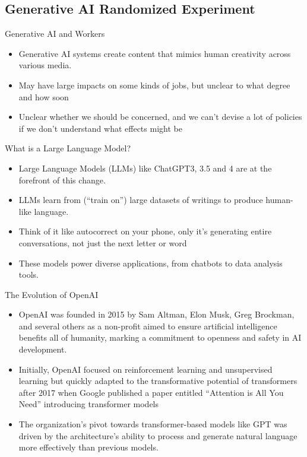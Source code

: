 \documentclass{beamer}
\begin{document}
\subsection{Generative AI Randomized Experiment}

\begin{frame}{Generative AI and Workers}
\begin{itemize}
  \item Generative AI systems create content that mimics human creativity across various media.
  \item May have large impacts on some kinds of jobs, but unclear to what degree and how soon
  \item Unclear whether we should be concerned, and we can't devise a lot of policies if we don't understand what effects might be
\end{itemize}
\end{frame}


\begin{frame}{What is a Large Language Model?}
\begin{itemize}
  \item Large Language Models (LLMs) like ChatGPT3, 3.5 and 4 are at the forefront of this change.
  \item LLMs learn from (``train on'') large datasets of writings to produce human-like language.
  \item Think of it like autocorrect on your phone, only it's generating entire conversations, not just the next letter or word
  \item These models power diverse applications, from chatbots to data analysis tools.
\end{itemize}
\end{frame}


\begin{frame}{The Evolution of OpenAI}
\begin{itemize}
  \item OpenAI was founded in 2015 by Sam Altman, Elon Musk, Greg Brockman, and several others as a non-profit  aimed to ensure artificial intelligence benefits all of humanity, marking a commitment to openness and safety in AI development.
  \item Initially, OpenAI focused on reinforcement learning and unsupervised learning but quickly adapted to the transformative potential of transformers after 2017 when Google published a paper entitled ``Attention is All You Need'' introducing transformer models
  \item The organization's pivot towards transformer-based models like GPT was driven by the architecture's ability to process and generate natural language more effectively than previous models.
\end{itemize}
\end{frame}
\end{document}
